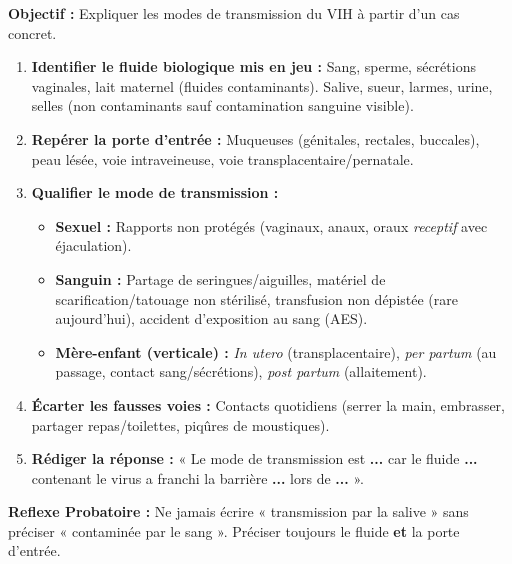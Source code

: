 \documentclass[11pt]{article}
\begin{document}
\begin{methode}
\textbf{Objectif :} Expliquer les modes de transmission du VIH à partir d'un cas concret.
\begin{enumerate}
    \item \textbf{Identifier le fluide biologique mis en jeu :} Sang, sperme, sécrétions vaginales, lait maternel (fluides contaminants). Salive, sueur, larmes, urine, selles (non contaminants sauf contamination sanguine visible).
    \item \textbf{Repérer la porte d'entrée :} Muqueuses (génitales, rectales, buccales), peau lésée, voie intraveineuse, voie transplacentaire/pernatale.
    \item \textbf{Qualifier le mode de transmission :}
    \begin{itemize}
        \item \textbf{Sexuel :} Rapports non protégés (vaginaux, anaux, oraux \emph{receptif} avec éjaculation).
        \item \textbf{Sanguin :} Partage de seringues/aiguilles, matériel de scarification/tatouage non stérilisé, transfusion non dépistée (rare aujourd'hui), accident d'exposition au sang (AES).
        \item \textbf{Mère-enfant (verticale) :} \emph{In utero} (transplacentaire), \emph{per partum} (au passage, contact sang/sécrétions), \emph{post partum} (allaitement).
    \end{itemize}
    \item \textbf{Écarter les fausses voies :} Contacts quotidiens (serrer la main, embrasser, partager repas/toilettes, piqûres de moustiques).
    \item \textbf{Rédiger la réponse :} « Le mode de transmission est \textbf{...} car le fluide \textbf{...} contenant le virus a franchi la barrière \textbf{...} lors de \textbf{...} ».
\end{enumerate}
\textbf{Reflexe Probatoire :} Ne jamais écrire « transmission par la salive » sans préciser « contaminée par le sang ». Préciser toujours le fluide \textbf{et} la porte d'entrée.
\end{methode}
\end{document}
